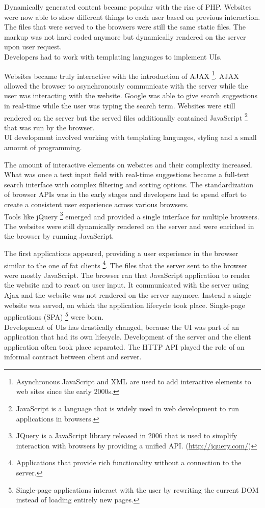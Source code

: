 Dynamically generated content became popular with the rise of PHP. Websites were now able to show different things to each user based on previous interaction. The files that were served to the browsers were still the same static files. The markup was not hard coded anymore but dynamically rendered on the server upon user request.
\\ Developers had to work with templating languages to implement UIs.

Websites became truly interactive with the introduction of AJAX \footnote{Asynchronous JavaScript and XML are used to add interactive elements to web sites since the early 2000s.}. AJAX allowed the browser to asynchronously communicate with the server while the user was interacting with the website. Google was able to give search suggestions in real-time while the user was typing the search term. Websites were still rendered on the server but the served files additionally contained JavaScript \footnote{JavaScript is a language that is widely used in web development to run applications in browsers.} that was run by the browser.
\\ UI development involved working with templating languages, styling and a small amount of programming.

The amount of interactive elements on websites and their complexity increased. What was once a text input field with real-time suggestions became a full-text search interface with complex filtering and sorting options. The standardization of browser APIs was in the early stages and developers had to spend effort to create a consistent user experience across various browsers.
\\ Tools like jQuery \footnote{JQuery is a JavaScript library released in 2006 that is used to simplify interaction with browsers by providing a unified API. (\url{http://jquery.com/})} emerged and provided a single interface for multiple browsers. The websites were still dynamically rendered on the server and were enriched in the browser by running JavaScript.

The first applications appeared, providing a user experience in the browser similar to the one of fat clients \footnote{Applications that provide rich functionality without a connection to the server.}. The files that the server sent to the browser were mostly JavaScript. The browser ran that JavaScript application to render the website and to react on user input. It communicated with the server using Ajax and the website was not rendered on the server anymore. Instead a single website was served, on which the application lifecycle took place. Single-page applications (SPA) \footnote{Single-page applications interact with the user by rewriting the current DOM instead of loading entirely new pages.} were born.
\\Development of UIs has drastically changed, because the UI was part of an application that had its own lifecycle. Development of the server and the client application often took place separated. The HTTP API played the role of an informal contract between client and server.

